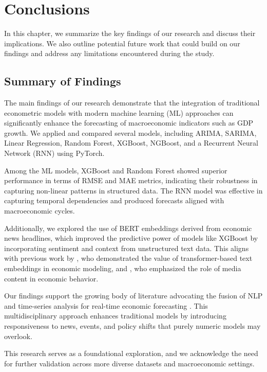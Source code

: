 \chapter{Conclusions}
\label{chap:conclusions}

In this chapter, we summarize the key findings of our research and discuss their implications. We also outline potential future work that could build on our findings and address any limitations encountered during the study.

\section{Summary of Findings}
\label{sec:summary-findings}

The main findings of our research demonstrate that the integration of traditional econometric models with modern machine learning (ML) approaches can significantly enhance the forecasting of macroeconomic indicators such as GDP growth. We applied and compared several models, including ARIMA, SARIMA, Linear Regression, Random Forest, XGBoost, NGBoost, and a Recurrent Neural Network (RNN) using PyTorch.

Among the ML models, XGBoost and Random Forest showed superior performance in terms of RMSE and MAE metrics, indicating their robustness in capturing non-linear patterns in structured data. The RNN model was effective in capturing temporal dependencies and produced forecasts aligned with macroeconomic cycles.

Additionally, we explored the use of BERT embeddings derived from economic news headlines, which improved the predictive power of models like XGBoost by incorporating sentiment and context from unstructured text data. This aligns with previous work by \citet{arora2021economicbert}, who demonstrated the value of transformer-based text embeddings in economic modeling, and \citet{gentzkow2019measuring}, who emphasized the role of media content in economic behavior.

Our findings support the growing body of literature advocating the fusion of NLP and time-series analysis for real-time economic forecasting \citep{baker2021forecasting, ng2022text}. This multidisciplinary approach enhances traditional models by introducing responsiveness to news, events, and policy shifts that purely numeric models may overlook.

This research serves as a foundational exploration, and we acknowledge the need for further validation across more diverse datasets and macroeconomic settings.

